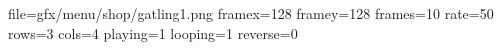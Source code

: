 file=gfx/menu/shop/gatling1.png
framex=128
framey=128
frames=10
rate=50
rows=3
cols=4
playing=1
looping=1
reverse=0